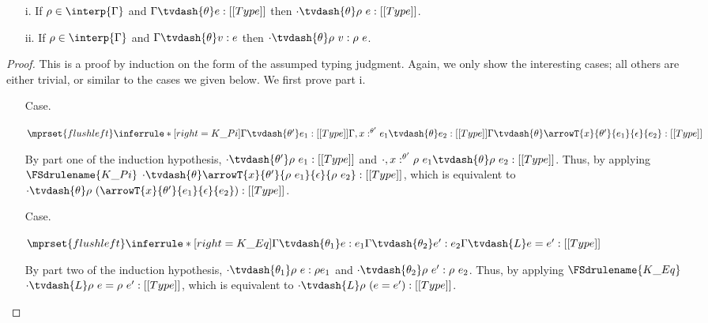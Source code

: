 \begin{lemma}
  \label{lemma:substitution_kinding_typing}
  \begin{itemize}
  \item[i.]   If $\rho \in \interp{\Gamma}$ and $\Gamma \tvdash{\theta} e:[[Type]]$ then 
    $\cdot \tvdash{\theta} \rho\ e:[[Type]]$.
  \item[ii.]   If $\rho \in \interp{\Gamma}$ and $\Gamma \tvdash{\theta} v:e$ then 
    $\cdot \tvdash{\theta} \rho\ v:\rho\ e$.
  \end{itemize}
\end{lemma}
\begin{proof}
  This is a proof by induction on the form of the assumped typing
  judgment. Again, we only show the interesting cases; all others are
  either trivial, or similar to the cases we given below. We first
  prove part i.
  \begin{itemize}      
    \item[Case.]\ \\
      \begin{center}
        \begin{math}
          $$\mprset{flushleft}
          \inferrule* [right=K\_Pi] {
            \Gamma \tvdash{\theta'} e_1:[[Type]]
            \\\\
            \Gamma,x:^{\theta'} e_1 \tvdash{\theta} e_2:[[Type]]
          }{\Gamma \tvdash{\theta} \arrowT{x}{\theta'}{e_1}{\epsilon}{e_2}:[[Type]]}
        \end{math}
      \end{center}
      By part one of the induction hypothesis, $\cdot \tvdash{\theta'} \rho\ e_1:[[Type]]$ and
      $\cdot,x:^{\theta'} \rho\ e_1 \tvdash{\theta} \rho\ e_2:[[Type]]$.  Thus, by applying 
      $\FSdrulename{K\_Pi}$ 
      $\cdot \tvdash{\theta} \arrowT{x}{\theta'}{\rho\ e_1}{\epsilon}{\rho\ e_2}:[[Type]]$, which
      is equivalent to 
      $\cdot \tvdash{\theta} \rho\ (\arrowT{x}{\theta'}{e_1}{\epsilon}{e_2}):[[Type]]$.
      
    \item[Case.]\ \\
      \begin{center}
        \begin{math}
          $$\mprset{flushleft}
          \inferrule* [right=K\_Eq] {
            \Gamma \tvdash{\theta_1} e:e_1
            \\\\
            \Gamma \tvdash{\theta_2} e':e_2
          }{\Gamma \tvdash{L} e = e':[[Type]]}
        \end{math}
      \end{center}
      By part two of the induction hypothesis, $\cdot \tvdash{\theta_1} \rho\ e:\rho e_1$ and
      $\cdot \tvdash{\theta_2} \rho\ e':\rho\ e_2$.  Thus, by applying $\FSdrulename{K\_Eq}$
      $\cdot \tvdash{L} \rho\ e = \rho\ e':[[Type]]$, which is equivalent to
      $\cdot \tvdash{L} \rho\ (e = e'):[[Type]]$.
  \end{itemize}
  

\end{proof}
